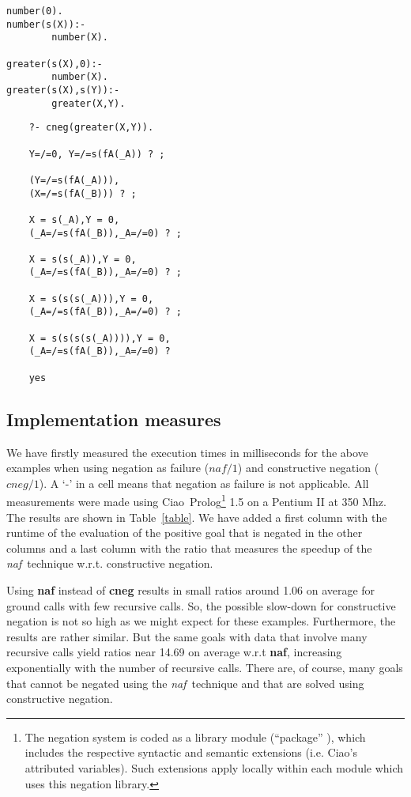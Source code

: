 \documentclass{llncs}
\newcommand{\naf}{{\em naf}}\newcommand{\viejo}[1]{}
\newcommand{\ciao}{Ciao}
\begin{document}
\begin{minipage}{1.5in}
\begin{verbatim}
number(0).
number(s(X)):-
        number(X).

greater(s(X),0):-
        number(X).
greater(s(X),s(Y)):-
        greater(X,Y).
\end{verbatim}
\end{minipage}
\begin{minipage}{2.5in}
\begin{verbatim} 
    ?- cneg(greater(X,Y)).

    Y=/=0, Y=/=s(fA(_A)) ? ;

    (Y=/=s(fA(_A))), 
    (X=/=s(fA(_B))) ? ;

    X = s(_A),Y = 0,
    (_A=/=s(fA(_B)),_A=/=0) ? ;

    X = s(s(_A)),Y = 0,
    (_A=/=s(fA(_B)),_A=/=0) ? ;

    X = s(s(s(_A))),Y = 0,
    (_A=/=s(fA(_B)),_A=/=0) ? ;

    X = s(s(s(s(_A)))),Y = 0,
    (_A=/=s(fA(_B)),_A=/=0) ? 

    yes
\end{verbatim} 
\end{minipage}

\subsection{Implementation measures}

We have firstly measured the execution times in milliseconds for the
above examples when using negation as failure ($naf/1$) and
constructive negation ($cneg/1$). A `-' in a cell means that negation
as failure is not applicable. All measurements were made using \ciao\
Prolog\footnote{The negation system is coded as a library module
(``package'' \cite{ciao-modules-cl2000}), which includes the
respective syntactic and semantic extensions (i.e. Ciao's
attributed variables). Such extensions apply locally within each
module which uses this negation library.} 1.5 on a Pentium II at 350
Mhz. The results are shown in Table~\ref{table}. We have added a first
column with the runtime of the evaluation of the positive goal that is
negated in the other columns and a last column with the ratio that
measures the speedup of the \naf\ technique w.r.t. constructive
negation.

Using {\bf naf} instead of {\bf cneg} results in small ratios around
1.06 on average for ground calls with few recursive calls. So, the
possible slow-down for constructive negation is not so high as we
might expect for these examples. Furthermore, the results are rather
similar. But the same goals with data that involve many recursive
calls yield ratios near 14.69 on average w.r.t {\bf naf},
increasing exponentially with the number of recursive calls. There
are, of course, many goals that cannot be negated using the \naf\
technique and that are solved using constructive negation.
\end{document}
